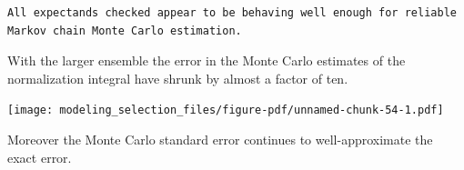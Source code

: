 \documentclass[
  letterpaper,
  DIV=11,
  numbers=noendperiod]{scrartcl}
\newenvironment{Shaded}{\begin{snugshade}}{\end{snugshade}}
\newcommand{\AttributeTok}[1]{\textcolor[rgb]{0.40,0.45,0.13}{#1}}
\newcommand{\DecValTok}[1]{\textcolor[rgb]{0.68,0.00,0.00}{#1}}
\newcommand{\FunctionTok}[1]{\textcolor[rgb]{0.28,0.35,0.67}{#1}}
\newcommand{\NormalTok}[1]{\textcolor[rgb]{0.00,0.23,0.31}{#1}}
\newcommand{\SpecialCharTok}[1]{\textcolor[rgb]{0.37,0.37,0.37}{#1}}
\newcommand{\StringTok}[1]{\textcolor[rgb]{0.13,0.47,0.30}{#1}}
\begin{document}
\begin{verbatim}
All expectands checked appear to be behaving well enough for reliable
Markov chain Monte Carlo estimation.
\end{verbatim}

With the larger ensemble the error in the Monte Carlo estimates of the
normalization integral have shrunk by almost a factor of ten.

\begin{Shaded}
\end{Shaded}

\texttt{[image: modeling\_selection\_files/figure-pdf/unnamed-chunk-54-1.pdf]}

Moreover the Monte Carlo standard error continues to well-approximate
the exact error.
\end{document}
